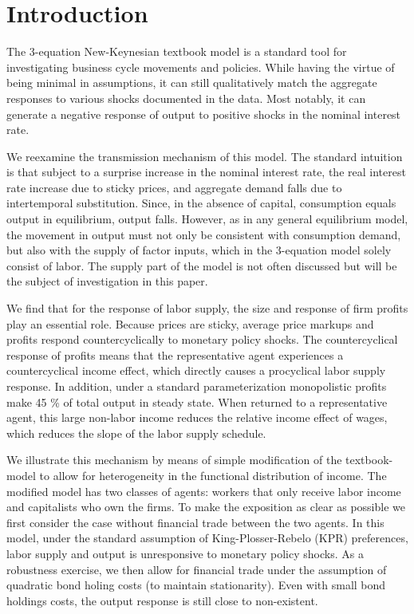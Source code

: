 \section{Introduction}
The 3-equation New-Keynesian textbook model is a standard tool for investigating business cycle movements and policies. While having the virtue of being minimal in assumptions, it can still qualitatively match the aggregate responses to various shocks documented in the data. Most notably, it can generate a negative response of output to positive shocks in the nominal interest rate.

We reexamine the transmission mechanism of this model. The standard intuition is that subject to a surprise increase in the nominal interest rate, the real interest rate increase due to sticky prices, and aggregate demand falls due to intertemporal substitution. Since, in the absence of capital, consumption equals output in equilibrium, output falls. However, as in any general equilibrium model, the movement in output must not only be consistent with consumption demand, but also with the supply of factor inputs, which in the 3-equation model solely consist of labor. The supply part of the model is not often discussed but will be the subject of investigation in this paper.

We find that for the response of labor supply, the size and response of firm profits play an essential role. Because prices are sticky, average price markups and profits respond countercyclically to monetary policy shocks. The countercyclical response of profits means that the representative agent experiences a countercyclical income effect, which directly causes a procyclical labor supply response. In addition, under a standard parameterization monopolistic profits make 45 \% of total output in steady state. When returned to a representative agent, this large non-labor income reduces the relative income effect of wages, which reduces the slope of the labor supply schedule.    

We illustrate this mechanism by means of simple modification of the textbook-model to allow for heterogeneity in the functional distribution of income. The modified model has two classes of agents: workers that only receive labor income and capitalists who own the firms. To make the exposition as clear as possible we first consider the case without financial trade between the two agents. In this model, under the standard assumption of King-Plosser-Rebelo (KPR) preferences, labor supply and output is unresponsive to monetary policy shocks. As a robustness exercise, we then allow for financial trade under the assumption of quadratic bond holing costs (to maintain stationarity). Even with small bond holdings costs, the output response is still close to non-existent.

